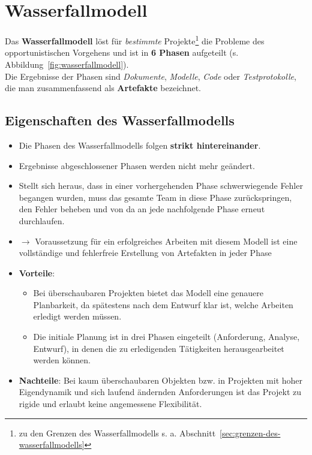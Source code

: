 \section{Wasserfallmodell}

Das \textbf{Wasserfallmodell} löst für \textit{bestimmte} Projekte\footnote{
zu den Grenzen des Wasserfallmodells s. a. Abschnitt~\ref{sec:grenzen-des-wasserfallmodells}
} die Probleme des opportunistischen Vorgehens und ist in \textbf{6 Phasen} aufgeteilt (s. Abbildung~\ref{fig:wasserfallmodell}).\\
Die Ergebnisse der Phasen sind \textit{Dokumente}, \textit{Modelle}, \textit{Code} oder \textit{Testprotokolle}, die man zusammenfassend als \textbf{Artefakte} bezeichnet.\\

\subsection*{Eigenschaften des Wasserfallmodells}
\begin{itemize}
    \item Die Phasen des Wasserfallmodells folgen \textbf{strikt hintereinander}.
    \item Ergebnisse abgeschlossener Phasen werden nicht mehr geändert.
    \item Stellt sich heraus, dass in einer vorhergehenden Phase schwerwiegende Fehler begangen wurden, muss das gesamte Team in diese Phase zurückspringen, den Fehler beheben und von da an jede nachfolgende Phase erneut durchlaufen.
    \item[] $\rightarrow$ Voraussetzung für ein erfolgreiches Arbeiten mit diesem Modell ist eine vollständige und fehlerfreie Erstellung von Artefakten in jeder Phase
    \item \textbf{Vorteile}:
        \begin{itemize}
            \item Bei überschaubaren Projekten bietet das Modell eine genauere Planbarkeit, da spätestens nach dem Entwurf klar ist, welche Arbeiten erledigt werden müssen.
            \item Die initiale Planung ist in drei Phasen eingeteilt (Anforderung, Analyse, Entwurf), in denen die zu erledigenden Tätigkeiten herausgearbeitet werden können.
        \end{itemize}
    \item \textbf{Nachteile}: Bei kaum überschaubaren Objekten bzw. in Projekten mit hoher Eigendynamik und sich laufend ändernden Anforderungen ist das Projekt zu rigide und erlaubt keine angemessene Flexibilität.
\end{itemize}




